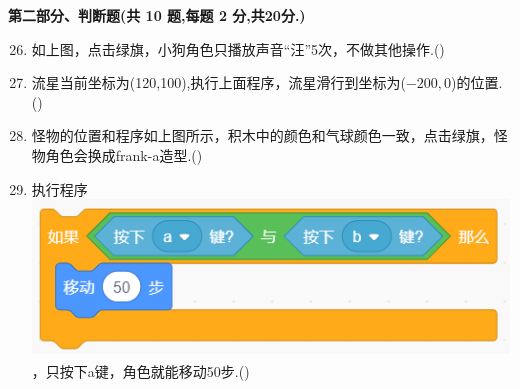 \documentclass[10pt, a4paper]{article}
\begin{document}
    {\noindent\textbf{第二部分、判断题(共 10 题,每题 2 分,共20分.)}}
    \begin{enumerate}
        \setcounter{enumi}{25}
        \item 如上图，点击绿旗，小狗角色只播放声音“汪”5次，不做其他操作.(\qquad)

        \item 流星当前坐标为(120,100),执行上面程序，流星滑行到坐标为($-200,0$)的位置.(\qquad)
        
        \item 怪物的位置和程序如上图所示，积木中的颜色和气球颜色一致，点击绿旗，怪物角色会换成frank-a造型.(\qquad)

        \item 执行程序\includegraphics[width=.3\textwidth]{29.png}，只按下a键，角色就能移动50步.(\qquad)
        

\end{enumerate}
\end{document}
